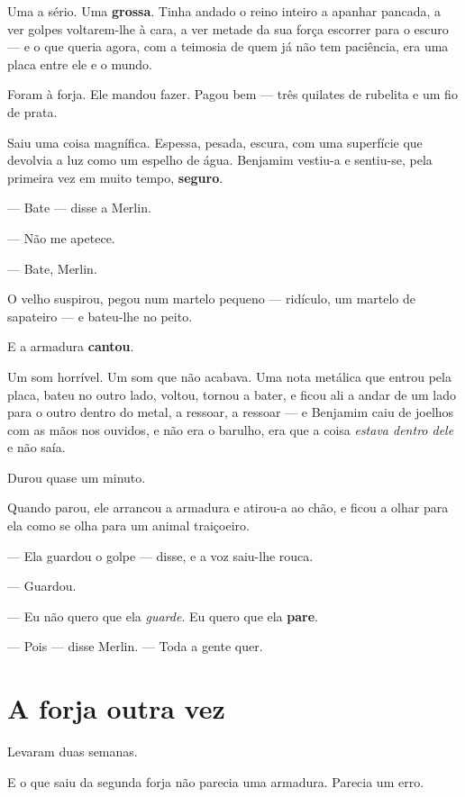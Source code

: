 \documentclass[livro.tex]{subfiles}
\begin{document}
Uma a sério. Uma \textbf{grossa}. Tinha andado o reino inteiro a apanhar pancada, a ver golpes voltarem-lhe à cara,
a ver metade da sua força escorrer para o escuro --- e o que queria agora, com a teimosia de quem já não tem
paciência, era uma placa entre ele e o mundo.

Foram à forja. Ele mandou fazer. Pagou bem --- três quilates de rubelita e um fio de prata.

\medskip

Saiu uma coisa magnífica. Espessa, pesada, escura, com uma superfície que devolvia a luz como um espelho de água.
Benjamim vestiu-a e sentiu-se, pela primeira vez em muito tempo, \textbf{seguro}.

--- Bate --- disse a Merlin.

--- Não me apetece.

--- Bate, Merlin.

\medskip

O velho suspirou, pegou num martelo pequeno --- ridículo, um martelo de sapateiro --- e bateu-lhe no peito.

\medskip

E a armadura \textbf{cantou}.

Um som horrível. Um som que não acabava. Uma nota metálica que entrou pela placa, bateu no outro lado, voltou,
tornou a bater, e ficou ali a andar de um lado para o outro dentro do metal, a ressoar, a ressoar --- e Benjamim
caiu de joelhos com as mãos nos ouvidos, e não era o barulho, era que a coisa \emph{estava dentro dele} e não saía.

Durou quase um minuto.

\medskip

Quando parou, ele arrancou a armadura e atirou-a ao chão, e ficou a olhar para ela como se olha para um animal
traiçoeiro.

--- Ela guardou o golpe --- disse, e a voz saiu-lhe rouca.

--- Guardou.

--- Eu não quero que ela \emph{guarde}. Eu quero que ela \textbf{pare}.

--- Pois --- disse Merlin. --- Toda a gente quer.

\section*{A forja outra vez}

Levaram duas semanas.

E o que saiu da segunda forja não parecia uma armadura. Parecia um erro.
\end{document}
